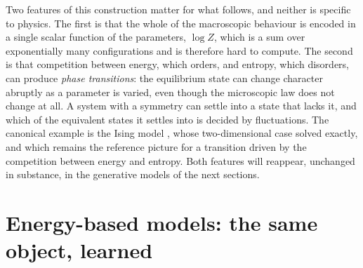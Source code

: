 Two features of this construction matter for what follows, and neither is
specific to physics. The first is that the whole of the macroscopic behaviour
is encoded in a single scalar function of the parameters, $\log Z$, which is a
sum over exponentially many configurations and is therefore hard to compute.
The second is that competition between energy, which orders, and entropy, which
disorders, can produce \emph{phase transitions}: the equilibrium state can
change character abruptly as a parameter is varied, even though the microscopic
law does not change at all. A system with a symmetry can settle into a state
that lacks it, and which of the equivalent states it settles into is decided by
fluctuations. The canonical example is the Ising model \citep{ising1925beitrag},
whose two-dimensional case \citet{onsager1944crystal} solved exactly, and which
remains the reference picture for a transition driven by the competition between
energy and entropy. Both features will reappear, unchanged in substance, in the
generative models of the next sections.

\section{Energy-based models: the same object, learned}
\label{sec:sm-ebm}

